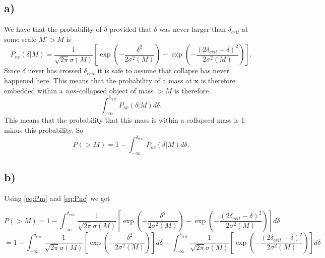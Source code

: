 \documentclass[a4paper,norsk, 10pt]{article}
\begin{document}
\subsection{a)}
We have that the probability of $\delta$ provided that $\delta$ was never larger than $\delta_{crit}$ at some scale $M' > M$ is
\begin{equation}\label{eq:Pnc}
P_{nc}(\delta|M) = \frac{1}{\sqrt{2\pi}\sigma(M)}\left[\exp\left(-\frac{\delta^2}{2\sigma^2 (M)}\right)-\exp\left(-\frac{(2\delta_{crit} - \delta)^2}{2\sigma^2 (M)}\right)\right].
\end{equation}
Since $\delta$ never has crossed $\delta_{crit}$ it is safe to assume that collapse has never happened here. This means that the probability of a mass at $\mathbf{x}$ is  therefore  embedded  within  a  \textit{non}-collapsed object of mass $>M$ is therefore
\begin{equation}
\int_{-\infty}^{\delta_{crit}} P_{nc}(\delta|M) d\delta.
\end{equation}
This means that the probability that this mass is within a collapsed mass is 1 minus this probability. So
\begin{equation}\label{eq:Pm}
P(>M) = 1 - \int_{-\infty}^{\delta_{crit}} P_{nc}(\delta|M) d\delta.
\end{equation}

\subsection{b)}
Using \eqref{eq:Pm} and \eqref{eq:Pnc} we get

\begin{equation}\label{eq:Pm}
P(>M) = 1 - \int_{-\infty}^{\delta_{crit}} \frac{1}{\sqrt{2\pi}\sigma(M)}\left[\exp\left(-\frac{\delta^2}{2\sigma^2 (M)}\right)-\exp\left(-\frac{(2\delta_{crit} - \delta)^2}{2\sigma^2 (M)}\right)\right] d\delta
\end{equation}
\begin{equation}
= 1 - \int_{-\infty}^{\delta_{crit}} \frac{1}{\sqrt{2\pi}\sigma(M)}\left[\exp\left(-\frac{\delta^2}{2\sigma^2 (M)}\right)\right]d\delta+\int_{-\infty}^{\delta_{crit}} \frac{1}{\sqrt{2\pi}\sigma(M)}\left[\exp\left(-\frac{(2\delta_{crit} - \delta)^2}{2\sigma^2 (M)}\right)\right] d\delta
\end{equation}
\end{document}
